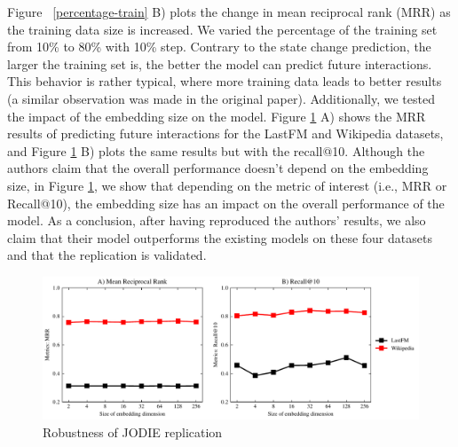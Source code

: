 Figure ~\ref{percentage-train} B) plots the change in mean
reciprocal rank (MRR) as the training data size is increased. We varied the percentage of the training set from 10\% to 80\% with 10\% step. Contrary to the state change prediction, the larger the training set is, the better the model can predict future interactions. This behavior is rather typical, where more training data leads to better results (a similar observation was made in the original paper).  Additionally, we tested the impact of the embedding size on the model. Figure \ref{emb-size} A)  shows the MRR results of predicting future interactions for the  LastFM and Wikipedia datasets, and  Figure \ref{emb-size} B) plots the same results but with the recall@10. Although the authors claim that the overall performance doesn't depend on the embedding size, in Figure \ref{emb-size},  we show that depending on the metric of interest (i.e., MRR or Recall@10), the embedding size has an impact on the overall performance of the model. As a conclusion, after having reproduced the authors' results, we also claim that their model outperforms the existing models on these four datasets and that the replication is validated.

\begin{figure}[htbp]
    \centering
    \includegraphics[width = \textwidth]{image/lastFM-wiki.pdf}
    \caption{Robustness of JODIE replication}
    \label{emb-size}
\end{figure}

